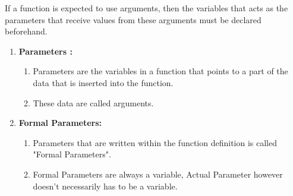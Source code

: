 If a function is expected to use arguments,
then the variables that acts as the parameters that receive
values from these arguments must be declared beforehand. \\

\begin{enumerate}
    \item  \textbf{Parameters :}
          \begin{enumerate}
              \item Parameters are the variables in a function that
                    points to a part of the data that is
                    inserted into the function.
              \item These data are called arguments.

          \end{enumerate}

    \item \textbf{Formal Parameters:}
          \begin{enumerate}
              \item Parameters that are written within the
                    function definition is called "Formal Parameters".

              \item Formal Parameters are always a variable,
                    Actual Parameter however doesn't necessarily has
                    to be a variable.

          \end{enumerate}



\end{enumerate}
